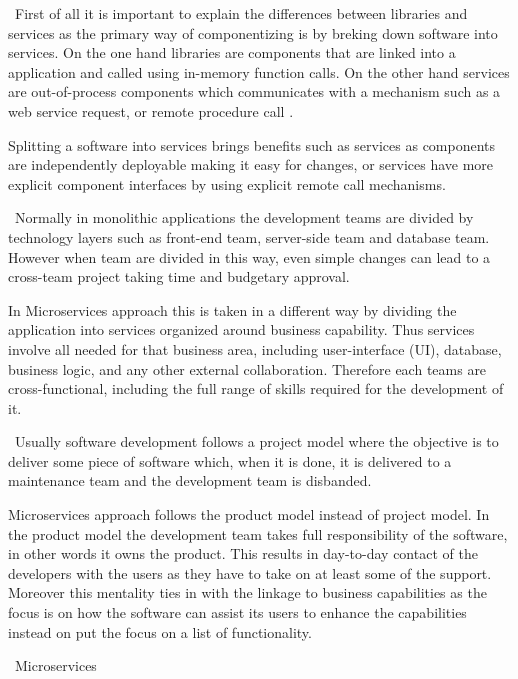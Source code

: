 \begin{description}[style=nextline]
\item[Componentization via Services] \hfill \
First of all it is important to explain the differences between libraries and services as the primary way of componentizing is by breking down software into services. On the one hand libraries are components that are linked into a application and called using in-memory function calls. On the other hand services are out-of-process components which communicates with a mechanism such as a web service request, or remote procedure call \citep{Fowler2014}.

Splitting a software into services brings benefits such as services as components are independently deployable making it easy for changes, or services have more explicit component interfaces by using explicit remote call mechanisms. 
\item[Organized around Business Capabilities] \hfill \
Normally in monolithic applications the development teams are divided by technology layers such as front-end team, server-side team and database team. However when team are divided in this way, even simple changes can lead to a cross-team project taking time and budgetary approval.

In Microservices approach this is taken in a different way by dividing the application into services organized around business capability. Thus services involve all needed for that business area, including user-interface (UI), database, business logic, and any other external collaboration. Therefore each teams are cross-functional, including the full range of skills required for the development of it.
\item[Products not Projects] \hfill \
Usually software development follows a project model where the objective is to deliver some piece of software which, when it is done, it is delivered to a maintenance team and the development team is disbanded.

Microservices approach follows the product model instead of project model. In the product model the development team takes full responsibility of the software, in other words it owns the product. This results in day-to-day contact of the developers with the users as they have to take on at least some of the support. Moreover this mentality ties in with the linkage to business capabilities as the focus is on how the software can assist its users to enhance the capabilities instead on put the focus on a list of functionality.
\item[Smart endpoints and dumb pipes] \hfill \
Microservices 
\item[Decentralized Governance] \hfill \

\item[Decentralized Data Management] \hfill \

\item[Infrastructure automation] \hfill \

\item[Design for failure] \hfill \

\item[Evolutionary design] \hfill \
\end{description}
